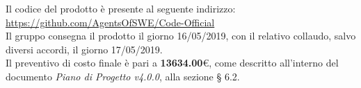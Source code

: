 \documentclass[11pt, a4paper]{letter} %
\begin{document}
\begin{letter}
\begin{itemize}
		\end{itemize}
		Il codice del prodotto è presente al seguente indirizzo: \url{https://github.com/AgentsOfSWE/Code-Official}\\
		Il gruppo consegna il prodotto il giorno 16/05/2019, con il relativo collaudo, salvo diversi accordi, il giorno 17/05/2019.\\  
		Il preventivo di costo finale è pari a \textbf{13634.00}€, come descritto all'interno del documento \textit{Piano di Progetto v4.0.0}, alla sezione § 6.2.\\ %

\end{letter}
\end{document}
